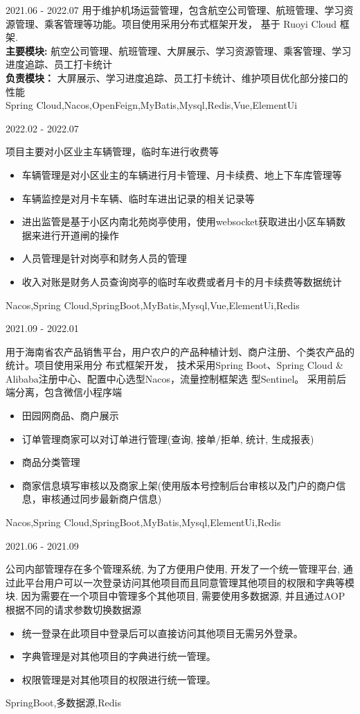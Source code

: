 \documentclass[zh]{resume}
\begin{document}
\begin{projects}
  \project
  {\color{accentcolor}{机场运营管理}}{2021.06 - 2022.07}
  {
    用于维护机场运营管理，包含航空公司管理、航班管理、学习资源管理、乘客管理等功能。项目使用采用分布式框架开发，
    基于 Ruoyi Cloud 框架. \\
    {\textbf{主要模块: } 航空公司管理、航班管理、大屏展示、学习资源管理、乘客管理、学习进度追踪、员工打卡统计} \\
    {\textbf{负责模块：} 大屏展示、学习进度追踪、员工打卡统计、维护项目优化部分接口的性能} \\
  }
  {Spring Cloud,Nacos,OpenFeign,MyBatis,Mysql,Redis,Vue,ElementUi}

	\project
  {\color{accentcolor}{中谷苑车辆道闸系统}}{2022.02 - 2022.07}
  {
    项目主要对小区业主车辆管理，临时车进行收费等
    \begin{itemize}
      \item 车辆管理是对小区业主的车辆进行月卡管理、月卡续费、地上下车库管理等
      \item 车辆监控是对月卡车辆、临时车进出记录的相关记录等
      \item 进出监管是基于小区内南北苑岗亭使用，使用websocket获取进出小区车辆数据来进行开道闸的操作
      \item 人员管理是针对岗亭和财务人员的管理
      \item 收入对账是财务人员查询岗亭的临时车收费或者月卡的月卡续费等数据统计
    \end{itemize}
  }
  {Nacos,Spring Cloud,SpringBoot,MyBatis,Mysql,Vue,ElementUi,Redis}

	\project
  {\color{accentcolor}{田园网}}{2021.09 - 2022.01}
  {
    用于海南省农产品销售平台，用户农户的产品种植计划、商户注册、个类农产品的统计。项目使用采用分 布式框架开发，
    技术采用Spring Boot、Spring Cloud \& Alibaba注册中心、配置中心选型Nacos，流量控制框架选 型Sentinel。
    采用前后端分离，包含微信小程序端
    \begin{itemize}
      \item 田园网商品、商户展示
      \item 订单管理商家可以对订单进行管理(查询, 接单/拒单, 统计, 生成报表)
      \item 商品分类管理
      \item 商家信息填写审核以及商家上架(使用版本号控制后台审核以及门户的商户信息，审核通过同步最新商户信息)
    \end{itemize}
  }
  {Nacos,Spring Cloud,SpringBoot,MyBatis,Mysql,ElementUi,Redis}

	\project
  {\color{accentcolor}{统一管理平台}}{2021.06 - 2021.09}
  {
    公司内部管理存在多个管理系统, 为了方便用户使用, 开发了一个统一管理平台, 
    通过此平台用户可以一次登录访问其他项目而且同意管理其他项目的权限和字典等模块. 
    因为需要在一个项目中管理多个其他项目, 需要使用多数据源, 并且通过AOP根据不同的请求参数切换数据源
    \begin{itemize}
      \item 统一登录在此项目中登录后可以直接访问其他项目无需另外登录。
      \item 字典管理是对其他项目的字典进行统一管理。
      \item 权限管理是对其他项目的权限进行统一管理。
    \end{itemize}
  }
  {SpringBoot,多数据源,Redis}



\end{projects}
\end{document}
